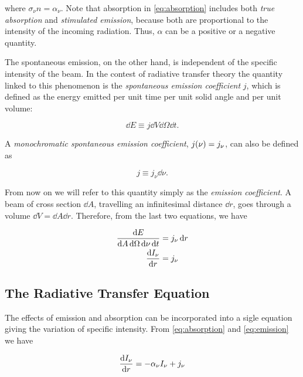 where $\sigma_\nu n = \alpha_\nu$. Note that absorption in
\autoref{eq:absorption} includes both \emph{true absorption} and
\emph{stimulated emission}, because both are proportional to the intensity
of the incoming radiation. Thus, $\alpha$ can be a positive or a negative
quantity.

The spontaneous emission, on the other hand, is independent of the
specific intensity of the beam. In the contest of radiative transfer theory
the quantity linked to this phenomenon is the \emph{spontaneous emission
coefficient} $j$, which is defined as the energy emitted
per unit time per unit solid angle and per unit volume:

\begin{equation}
        \dd{E} \equiv j\dd{V}\dd{\Omega}\dd{t}.
\end{equation}

A \emph{monochromatic spontaneous emission coefficient}, $j\qty(\nu) =
j_\nu$, can also be defined as

\begin{equation}
        j \equiv j_\nu \dd{\nu}.
\end{equation}

From now on we will refer to this quantity simply as the \emph{emission
coefficient}.
A beam of cross section $\dd{A}$, travelling an infinitesimal distance
$\dd{r}$, goes through a volume $\dd{V} = \dd{A} \dd{r}$. Therefore, from
the last two equations, we have

\begin{equation}
        \begin{split}
        \frac{\dd{E}}{\dd{A}\dd{\Omega}\dd{\nu}\dd{t}} & = j_\nu \dd{r} \\
        \dv{I_\nu}{r} & = j_\nu
        \label{eq:emission}
        \end{split}
\end{equation}

\subsection{The Radiative Transfer Equation}

The effects of emission and absorption can be incorporated into a sigle
equation giving the variation of specific intensity. From \autoref{eq:absorption}
and \autoref{eq:emission} we have

\begin{equation}
        \dv{I_\nu}{r} = -\alpha_\nu I_\nu + j_\nu
\end{equation}

